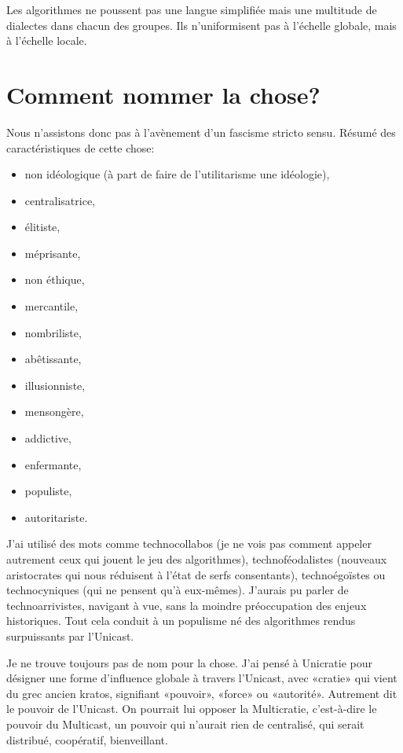 \documentclass[a5paper, 10pt, twoside]{book}
\let\oldsection\section
\renewcommand{\section}[1]{%
  \oldsection{#1}%
  \par\vspace{\baselineskip}%
}
\newcommand{\pandocbounded}[1]{%
  \begin{center}
    \sbox0{#1}%
    \ifdim\ht0>\textheight
      \resizebox*{\textwidth}{!}{#1}%
    \else
      #1%
    \fi
  \end{center}
}
\providecommand{\tightlist}{%
  \setlength{\itemsep}{0pt}\setlength{\parskip}{0pt}%
}
\begin{document}
Les algorithmes ne poussent pas une langue simplifiée mais une multitude
de dialectes dans chacun des groupes. Ils n’uniformisent pas à l’échelle
globale, mais à l’échelle locale.

\section{\texorpdfstring{Comment nommer la
chose?}{   }}\label{comment-nommer-la-chose}

Nous n’assistons donc pas à l’avènement d’un fascisme stricto sensu.
Résumé des caractéristiques de cette chose:

\begin{itemize}
\tightlist
\item
  non idéologique (à part de faire de l’utilitarisme une idéologie),
\item
  centralisatrice,
\item
  élitiste,
\item
  méprisante,
\item
  non éthique,
\item
  mercantile,
\item
  nombriliste,
\item
  abêtissante,
\item
  illusionniste,
\item
  mensongère,
\item
  addictive,
\item
  enfermante,
\item
  populiste,
\item
  autoritariste.
\end{itemize}

J’ai utilisé des mots comme technocollabos (je ne vois pas comment
appeler autrement ceux qui jouent le jeu des algorithmes),
technoféodalistes (nouveaux aristocrates qui nous réduisent à l’état de
serfs consentants), technoégoïstes ou technocyniques (qui ne pensent
qu’à eux-mêmes). J’aurais pu parler de technoarrivistes, navigant à vue,
sans la moindre préoccupation des enjeux historiques. Tout cela conduit
à un populisme né des algorithmes rendus surpuissants par l’Unicast.

\pandocbounded{\texttt{[image: \_i/TroisCouches.png]}}

Je ne trouve toujours pas de nom pour la chose. J’ai pensé à Unicratie
pour désigner une forme d’influence globale à travers l’Unicast, avec
«cratie» qui vient du grec ancien kratos, signifiant «pouvoir», «force»
ou «autorité». Autrement dit le pouvoir de l’Unicast. On pourrait lui
opposer la Multicratie, c’est-à-dire le pouvoir du Multicast, un pouvoir
qui n’aurait rien de centralisé, qui serait distribué, coopératif,
bienveillant.
\end{document}
